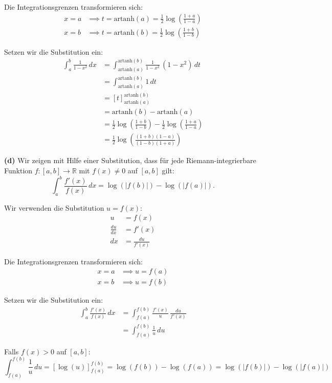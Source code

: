 \documentclass{article}
\begin{document}
Die Integrationsgrenzen transformieren sich:
\begin{align}
x = a &\implies t = \text{artanh}(a) = \frac{1}{2}\log\left(\frac{1+a}{1-a}\right)\\
x = b &\implies t = \text{artanh}(b) = \frac{1}{2}\log\left(\frac{1+b}{1-b}\right)
\end{align}

Setzen wir die Substitution ein:
\begin{align}
\int_a^b\frac{1}{1-x^2}\,dx &= \int_{\text{artanh}(a)}^{\text{artanh}(b)}\frac{1}{1-x^2}\,(1-x^2)\,dt\\
&= \int_{\text{artanh}(a)}^{\text{artanh}(b)} 1\,dt\\
&= \left[t\right]_{\text{artanh}(a)}^{\text{artanh}(b)}\\
&= \text{artanh}(b) - \text{artanh}(a)\\
&= \frac{1}{2}\log\left(\frac{1+b}{1-b}\right) - \frac{1}{2}\log\left(\frac{1+a}{1-a}\right)\\
&= \frac{1}{2}\log\left(\frac{(1+b)(1-a)}{(1-b)(1+a)}\right)
\end{align}

\textbf{(d)} Wir zeigen mit Hilfe einer Substitution, dass für jede Riemann-integrierbare Funktion $f:[a,b]\to\mathbb{R}$ mit $f(x) \neq 0$ auf $[a,b]$ gilt:
$$\int_a^b\frac{f'(x)}{f(x)}\,dx = \log(|f(b)|)- \log(|f(a)|).$$

Wir verwenden die Substitution $u = f(x)$:
\begin{align}
u &= f(x)\\
\frac{du}{dx} &= f'(x)\\
dx &= \frac{du}{f'(x)}
\end{align}

Die Integrationsgrenzen transformieren sich:
\begin{align}
x = a &\implies u = f(a)\\
x = b &\implies u = f(b)
\end{align}

Setzen wir die Substitution ein:
\begin{align}
\int_a^b\frac{f'(x)}{f(x)}\,dx &= \int_{f(a)}^{f(b)}\frac{f'(x)}{u}\,\frac{du}{f'(x)}\\
&= \int_{f(a)}^{f(b)}\frac{1}{u}\,du
\end{align}

Falls $f(x) > 0$ auf $[a,b]$:
$$\int_{f(a)}^{f(b)}\frac{1}{u}\,du = \left[\log(u)\right]_{f(a)}^{f(b)} = \log(f(b)) - \log(f(a)) = \log(|f(b)|) - \log(|f(a)|)$$
\end{document}
